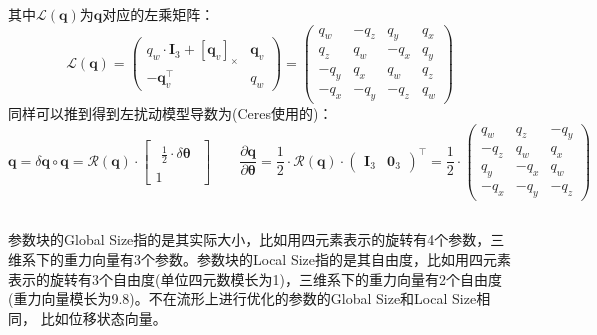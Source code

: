 \documentclass[12pt, onecolumn]{article}
\newcommand\normf{\fangsong}
\newcommand\liehat[1]{\left[ #1 \right]_\times}
\begin{document}
	其中$\mathcal{L}\left(\boldsymbol{q} \right)$为$\boldsymbol{q}$对应的左乘矩阵：
	\begin{equation}
	\mathcal{L}\left(\boldsymbol{q} \right)=\begin{pmatrix}
	q_w\cdot\boldsymbol{I}_3+\liehat{\boldsymbol{q}_v}&\boldsymbol{q}_v\\
	-\boldsymbol{q}_v^\top&q_w
	\end{pmatrix}=\left( \begin{array}{ccc|c}
	q_w&-q_z&q_y&q_x\\
	q_z&q_w&-q_x&q_y\\
	-q_y&q_x&q_w&q_z\\
	\hline
	-q_x&-q_y&-q_z&q_w
	\end{array}\right) 
	\end{equation}
	同样可以推到得到左扰动模型导数为(Ceres使用的)：
	\begin{equation}
	\boldsymbol{q}=\delta\boldsymbol{q}\circ\boldsymbol{q}=\mathcal{R}(\boldsymbol{q})\cdot\begin{bmatrix}
	\begin{aligned}
	\frac{1}{2}\cdot\delta\boldsymbol{\theta}
	\end{aligned}\\1
	\end{bmatrix}
	\qquad
		\frac{\partial \boldsymbol{q}}{\partial \boldsymbol{\theta}}
		=\frac{1}{2}\cdot\mathcal{R}\left(\boldsymbol{q} \right) \cdot\begin{pmatrix}
		\boldsymbol{I}_3&\boldsymbol{0}_3
		\end{pmatrix}^\top=
		\frac{1}{2}\cdot\left( \begin{array}{ccc}
			q_w&q_z&-q_y\\
			-q_z&q_w&q_x\\
			q_y&-q_x&q_w\\
			\hline
			-q_x&-q_y&-q_z
		\end{array}\right)
	\end{equation}


	\subsection{\normf{ceres评估函数}}
	参数块的Global Size指的是其实际大小，比如用四元素表示的旋转有4个参数，三维系下的重力向量有3个参数。参数块的Local Size指的是其自由度，比如用四元素表示的旋转有3个自由度(单位四元数模长为1)，三维系下的重力向量有2个自由度(重力向量模长为9.8)。不在流形上进行优化的参数的Global Size和Local Size相同， 比如位移状态向量。
	
\end{document}
